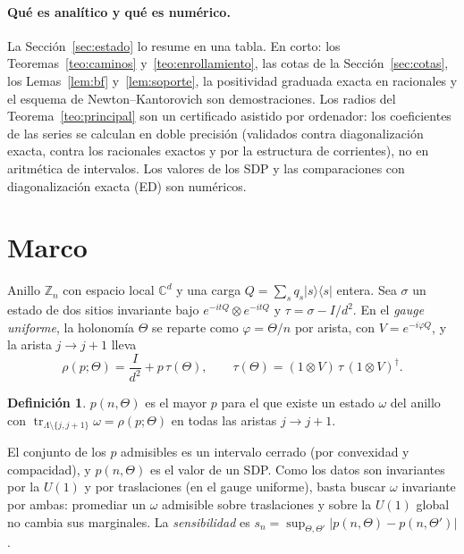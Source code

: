 \documentclass[11pt,a4paper]{article}
\theoremstyle{definition}
\newtheorem{definicion}[teorema]{Definición}
\theoremstyle{remark}
\newcommand{\tr}{\operatorname{tr}}
\newcommand{\ket}[1]{|#1\rangle}
\newcommand{\bra}[1]{\langle #1|}
\begin{document}
\paragraph{Qué es analítico y qué es numérico.} La Sección~\ref{sec:estado} lo resume en una tabla.
En corto: los Teoremas~\ref{teo:caminos} y~\ref{teo:enrollamiento}, las cotas de la
Sección~\ref{sec:cotas}, los Lemas~\ref{lem:bf} y~\ref{lem:soporte}, la positividad graduada exacta en
racionales y el esquema de Newton--Kantorovich son demostraciones. Los radios del
Teorema~\ref{teo:principal} son un certificado asistido por ordenador: los coeficientes de las series
se calculan en doble precisión (validados contra diagonalización exacta, contra los racionales exactos
y por la estructura de corrientes), no en aritmética de intervalos. Los valores de los SDP y las
comparaciones con diagonalización exacta (ED) son numéricos.

\section{Marco}\label{sec:marco}

Anillo $\mathbb Z_n$ con espacio local $\mathbb C^d$ y una carga $Q=\sum_sq_s\ket s\bra s$ entera. Sea
$\sigma$ un estado de dos sitios invariante bajo $e^{-itQ}\otimes e^{-itQ}$ y $\tau=\sigma-I/d^2$. En el
\emph{gauge uniforme}, la holonomía $\Theta$ se reparte como $\varphi=\Theta/n$ por arista, con
$V=e^{-i\varphi Q}$, y la arista $j\to j+1$ lleva
\begin{equation}\label{eq:rhop}
  \rho(p;\Theta)=\frac I{d^2}+p\,\tau(\Theta),\qquad \tau(\Theta)=(1\otimes V)\,\tau\,(1\otimes V)^\dagger .
\end{equation}

\begin{definicion}\label{def:p}
$p(n,\Theta)$ es el mayor $p$ para el que existe un estado $\omega$ del anillo con
$\tr_{\Lambda\setminus\{j,j+1\}}\omega=\rho(p;\Theta)$ en todas las aristas $j\to j+1$.
\end{definicion}

El conjunto de los $p$ admisibles es un intervalo cerrado (por convexidad y compacidad), y
$p(n,\Theta)$ es el valor de un SDP. Como los datos son invariantes por la $U(1)$ y por traslaciones
(en el gauge uniforme), basta buscar $\omega$ invariante por ambas: promediar un $\omega$ admisible
sobre traslaciones y sobre la $U(1)$ global no cambia sus marginales. La \emph{sensibilidad} es
$s_n=\sup_{\Theta,\Theta'}|p(n,\Theta)-p(n,\Theta')|$.
\end{document}

